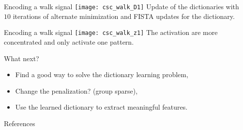 \documentclass[ignorenonframetext]{beamer}
\begin{document}
\begin{frame}{Encoding a walk signal}
	\centering
	\texttt{[image: csc\_walk\_D1]}
	Update of the dictionaries with $10$ iterations of alternate minimization and
	FISTA updates for the dictionary.
\end{frame}


\begin{frame}{Encoding a walk signal}
	\centering
	\texttt{[image: csc\_walk\_z1]}
	The activation are more concentrated and only activate one pattern.
\end{frame}


\begin{frame}{What next?}
	\begin{itemize}\itemsep1em
	\item Find a good way to solve the dictionary learning problem,
	\item Change the penalization? (group sparse),
	\item Use the learned dictionary to extract meaningful features.
\end{itemize}
\end{frame}


	

{
\begin{frame}{References}
	\tiny 
\end{frame}
}
\end{document}
